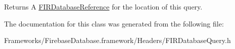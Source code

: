 \begin{DoxyReturn}{Returns}
A \hyperlink{interface_f_i_r_database_reference}{F\+I\+R\+Database\+Reference} for the location of this query. 
\end{DoxyReturn}


The documentation for this class was generated from the following file\+:\begin{DoxyCompactItemize}
\item 
Frameworks/\+Firebase\+Database.\+framework/\+Headers/F\+I\+R\+Database\+Query.\+h\end{DoxyCompactItemize}

